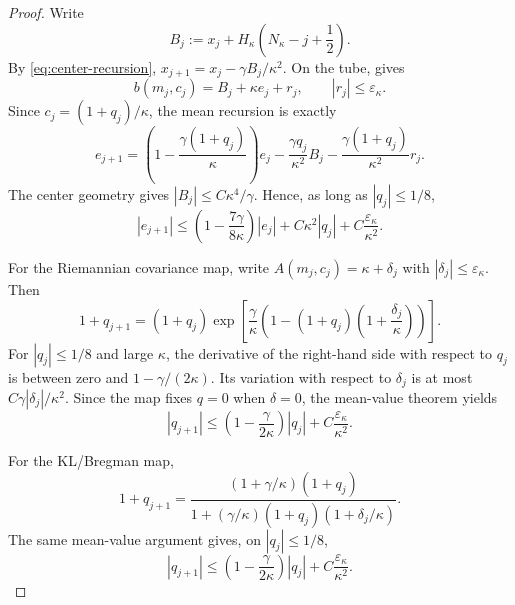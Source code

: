 \begin{proof}
Write
\[
    B_j:=x_j+H_\kappa\left(N_\kappa-j+\frac12\right).
\]
By \eqref{eq:center-recursion}, $x_{j+1}=x_j-\gamma B_j/\kappa^2$.  On the tube,
 gives
\[
    b(m_j,c_j)=B_j+\kappa e_j+r_j,
    \qquad
    |r_j|\leq\varepsilon_\kappa.
\]
Since $c_j=(1+q_j)/\kappa$, the mean recursion is exactly
\begin{equation}
\label{eq:mean-shadow-recursion}
    e_{j+1}
    =\left(1-\frac{\gamma(1+q_j)}{\kappa}\right)e_j
      -\frac{\gamma q_j}{\kappa^2}B_j
      -\frac{\gamma(1+q_j)}{\kappa^2}r_j.
\end{equation}
The center geometry gives $|B_j|\leq C\kappa^4/\gamma$.  Hence, as long as
$|q_j|\leq1/8$,
\begin{equation}
\label{eq:mean-shadow-bound}
    |e_{j+1}|
    \leq
    \left(1-\frac{7\gamma}{8\kappa}\right)|e_j|
    +C\kappa^2|q_j|
    +C\frac{\varepsilon_\kappa}{\kappa^2}.
\end{equation}

For the Riemannian covariance map, write
$A(m_j,c_j)=\kappa+\delta_j$ with $|\delta_j|\leq\varepsilon_\kappa$.  Then
\begin{equation}
\label{eq:q-R-exact}
    1+q_{j+1}
    =(1+q_j)
      \exp\left[
        \frac{\gamma}{\kappa}
        \left(
            1-(1+q_j)\left(1+\frac{\delta_j}{\kappa}\right)
        \right)
      \right].
\end{equation}
For $|q_j|\leq1/8$ and large $\kappa$, the derivative of the right-hand side with
respect to $q_j$ is between zero and $1-\gamma/(2\kappa)$.  Its variation with respect to
$\delta_j$ is at most $C\gamma|\delta_j|/\kappa^2$.  Since the map fixes $q=0$ when
$\delta=0$, the mean-value theorem yields
\begin{equation}
\label{eq:q-R-bound}
    |q_{j+1}|
    \leq
    \left(1-\frac{\gamma}{2\kappa}\right)|q_j|
    +C\frac{\varepsilon_\kappa}{\kappa^2}.
\end{equation}

For the KL/Bregman map,
\begin{equation}
\label{eq:q-KL-exact}
    1+q_{j+1}
    =
    \frac{(1+\gamma/\kappa)(1+q_j)}
         {1+(\gamma/\kappa)(1+q_j)(1+\delta_j/\kappa)}.
\end{equation}
The same mean-value argument gives, on $|q_j|\leq1/8$,
\begin{equation}
\label{eq:q-KL-bound}
    |q_{j+1}|
    \leq
    \left(1-\frac{\gamma}{2\kappa}\right)|q_j|
    +C\frac{\varepsilon_\kappa}{\kappa^2}.
\end{equation}


\end{proof}
